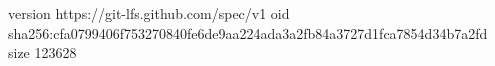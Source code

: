 version https://git-lfs.github.com/spec/v1
oid sha256:cfa0799406f753270840fe6de9aa224ada3a2fb84a3727d1fca7854d34b7a2fd
size 123628
